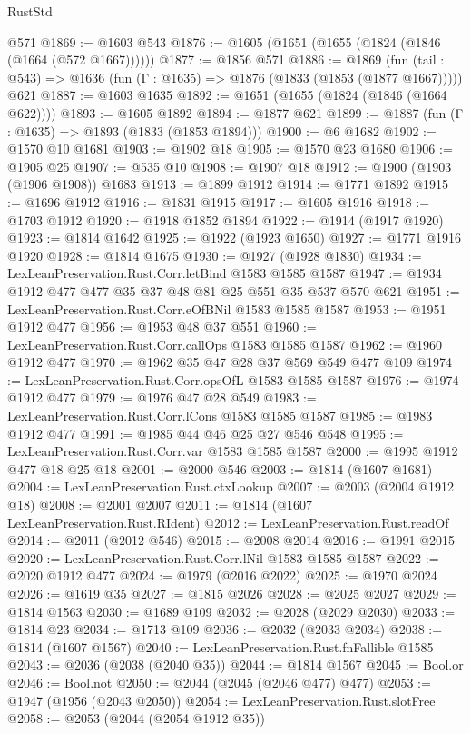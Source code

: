 \begin{lexlean}{RustStd}
\begin{coremodule}
    @571
@1869 := @1603 @543
@1876 := @1605 (@1651 (@1655 (@1824 (@1846 (@1664 (@572 @1667))))))
@1877 := @1856 @571
@1886 := @1869
    (fun (tail : @543) => @1636 (fun (Γ : @1635) => @1876 (@1833 (@1853 (@1877 @1667)))))
    @621
@1887 := @1603 @1635
@1892 := @1651 (@1655 (@1824 (@1846 (@1664 @622))))
@1893 := @1605 @1892
@1894 := @1877 @621
@1899 := @1887 (fun (Γ : @1635) => @1893 (@1833 (@1853 @1894)))
@1900 := @6 @1682
@1902 := @1570 @10 @1681
@1903 := @1902 @18
@1905 := @1570 @23 @1680
@1906 := @1905 @25
@1907 := @535 @10
@1908 := @1907 @18
@1912 := @1900 (@1903 (@1906 @1908)) @1683
@1913 := @1899 @1912
@1914 := @1771 @1892
@1915 := @1696 @1912
@1916 := @1831 @1915
@1917 := @1605 @1916
@1918 := @1703 @1912
@1920 := @1918 @1852 @1894
@1922 := @1914 (@1917 @1920)
@1923 := @1814 @1642
@1925 := @1922 (@1923 @1650)
@1927 := @1771 @1916 @1920
@1928 := @1814 @1675
@1930 := @1927 (@1928 @1830)
@1934 := LexLeanPreservation.Rust.Corr.letBind @1583 @1585 @1587
@1947 := @1934 @1912 @477 @477 @35 @37 @48 @81 @25 @551 @35 @537 @570 @621
@1951 := LexLeanPreservation.Rust.Corr.eOfBNil @1583 @1585 @1587
@1953 := @1951 @1912 @477
@1956 := @1953 @48 @37 @551
@1960 := LexLeanPreservation.Rust.Corr.callOps @1583 @1585 @1587
@1962 := @1960 @1912 @477
@1970 := @1962 @35 @47 @28 @37 @569 @549 @477 @109
@1974 := LexLeanPreservation.Rust.Corr.opsOfL @1583 @1585 @1587
@1976 := @1974 @1912 @477
@1979 := @1976 @47 @28 @549
@1983 := LexLeanPreservation.Rust.Corr.lCons @1583 @1585 @1587
@1985 := @1983 @1912 @477
@1991 := @1985 @44 @46 @25 @27 @546 @548
@1995 := LexLeanPreservation.Rust.Corr.var @1583 @1585 @1587
@2000 := @1995 @1912 @477 @18 @25 @18
@2001 := @2000 @546
@2003 := @1814 (@1607 @1681)
@2004 := LexLeanPreservation.Rust.ctxLookup
@2007 := @2003 (@2004 @1912 @18)
@2008 := @2001 @2007
@2011 := @1814 (@1607 LexLeanPreservation.Rust.RIdent)
@2012 := LexLeanPreservation.Rust.readOf
@2014 := @2011 (@2012 @546)
@2015 := @2008 @2014
@2016 := @1991 @2015
@2020 := LexLeanPreservation.Rust.Corr.lNil @1583 @1585 @1587
@2022 := @2020 @1912 @477
@2024 := @1979 (@2016 @2022)
@2025 := @1970 @2024
@2026 := @1619 @35
@2027 := @1815 @2026
@2028 := @2025 @2027
@2029 := @1814 @1563
@2030 := @1689 @109
@2032 := @2028 (@2029 @2030)
@2033 := @1814 @23
@2034 := @1713 @109
@2036 := @2032 (@2033 @2034)
@2038 := @1814 (@1607 @1567)
@2040 := LexLeanPreservation.Rust.fnFallible @1585
@2043 := @2036 (@2038 (@2040 @35))
@2044 := @1814 @1567
@2045 := Bool.or
@2046 := Bool.not
@2050 := @2044 (@2045 (@2046 @477) @477)
@2053 := @1947 (@1956 (@2043 @2050))
@2054 := LexLeanPreservation.Rust.slotFree
@2058 := @2053 (@2044 (@2054 @1912 @35))

\end{coremodule}
\end{lexlean}
